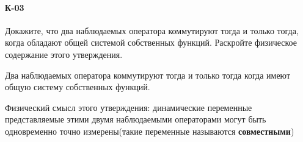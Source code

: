 \documentclass[__main__.tex]{subfiles}
\begin{document}
\paragraph{К-03}
Докажите, что два наблюдаемых оператора коммутируют тогда и только тогда, когда обладают общей системой собственных функций. Раскройте физическое содержание этого утверждения.

\begin{theorem}
	Два наблюдаемых оператора коммутируют тогда и только тогда когда имеют общую систему собственных функций.
\end{theorem}
Физический смысл этого утверждения: динамические переменные представляемые этими двумя наблюдаемыми операторами могут быть одновременно точно измерены(такие переменные называются \textbf{совместными})\\
\end{document}
